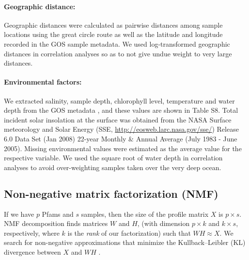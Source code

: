 
\paragraph{Geographic distance:} Geographic distances were calculated as pairwise distances among sample locations using the great circle route as well as the latitude and longitude recorded in the GOS sample metadata. We used log-transformed geographic distances in correlation analyses so as to not give undue weight to very large distances.

\paragraph{Environmental factors:} We extracted salinity, sample depth, chlorophyll level, temperature and water depth from the GOS metadata \cite{rusch_sorcerer_2007}, and these values are shown in Table S8. Total incident solar insolation at the surface was obtained from the NASA Surface meteorology and Solar Energy (SSE, \url{http://eosweb.larc.nasa.gov/sse/}) Release 6.0 Data Set (Jan 2008) 22-year Monthly $\&$ Annual Average (July 1983 - June 2005). Missing environmental values were estimated as the average value for the respective variable.  We used the square root of water depth in correlation analyses to avoid over-weighting samples taken over the very deep ocean. 

\subsection{Non-negative matrix factorization (NMF)}

If we have $p$ Pfams and $s$ samples, then the size of the profile matrix $X$ is $p\times s$. NMF decomposition finds matrices $W$ and $H$, (with dimension $p \times k$ and $k\times s$, respectively, where $k$ is the \emph{rank} of our factorization) such that $WH \approx X$. We search for non-negative approximations that minimize the Kullback--Leibler (KL) divergence between $X$ and $WH$ \cite{lee_learning_1999, brunet_metagenes_2004}. 

